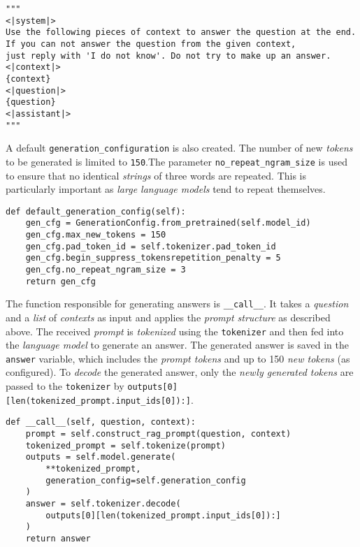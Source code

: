 \documentclass{article}
\begin{document}
\begin{lstlisting}[backgroundcolor = \color{lightgray!25}]
"""
<|system|>
Use the following pieces of context to answer the question at the end. 
If you can not answer the question from the given context, 
just reply with 'I do not know'. Do not try to make up an answer.
<|context|>
{context}
<|question|>
{question}
<|assistant|>
"""
\end{lstlisting}

A default \colorbox{lightgray!25}{\lstinline{generation_configuration}} is also created. The number of new \textit{tokens} to be generated is limited to \colorbox{lightgray!25}{\lstinline{150}}.The parameter \colorbox{lightgray!25}{\lstinline{no_repeat_ngram_size}} is used to ensure that no identical \textit{strings} of three words are repeated. This is particularly important as \textit{large language models} tend to repeat themselves.

\begin{lstlisting}[backgroundcolor = \color{lightgray!25}]
def default_generation_config(self):
    gen_cfg = GenerationConfig.from_pretrained(self.model_id)
    gen_cfg.max_new_tokens = 150
    gen_cfg.pad_token_id = self.tokenizer.pad_token_id
    gen_cfg.begin_suppress_tokensrepetition_penalty = 5
    gen_cfg.no_repeat_ngram_size = 3
    return gen_cfg
\end{lstlisting}

The function responsible for generating answers is \colorbox{lightgray!25}{\lstinline{__call__}}.   It takes a \textit{question} and a \textit{list} of \textit{contexts} as input and applies the \textit{prompt structure} as described above. The received \textit{prompt} is \textit{tokenized} using the \colorbox{lightgray!25}{\lstinline{tokenizer}} and then fed into the \textit{language model} to generate an answer.
The generated answer is saved in the \colorbox{lightgray!25}{\lstinline{answer}} variable, which includes the \textit{prompt tokens} and up to 150 \textit{new tokens} (as configured). To \textit{decode} the generated answer, only the \textit{newly generated tokens} are passed to the \colorbox{lightgray!25}{\lstinline{tokenizer}} by \colorbox{lightgray!25}{\lstinline{outputs[0][len(tokenized_prompt.input_ids[0]):]}}.
\begin{lstlisting}[backgroundcolor = \color{lightgray!25}]
def __call__(self, question, context):
    prompt = self.construct_rag_prompt(question, context)
    tokenized_prompt = self.tokenize(prompt)
    outputs = self.model.generate(
        **tokenized_prompt, 
        generation_config=self.generation_config
    )
    answer = self.tokenizer.decode(
        outputs[0][len(tokenized_prompt.input_ids[0]):]
    )
    return answer
\end{lstlisting}
\end{document}
